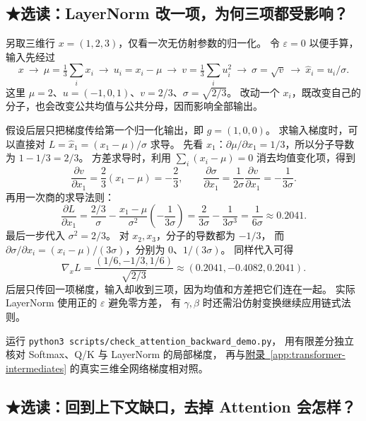 \subsection{\texorpdfstring{{\symboliconfont ★}}{★}选读：LayerNorm 改一项，为何三项都受影响？}
\label{sec:layernorm-backward-example}

另取三维行 $x=(1,2,3)$，仅看一次无仿射参数的归一化。
令 $\varepsilon=0$ 以便手算，输入先经过
\[
x\ \longrightarrow\ \mu=\tfrac13\sum_i x_i
\ \longrightarrow\ u_i=x_i-\mu
\ \longrightarrow\ v=\tfrac13\sum_i u_i^2
\ \longrightarrow\ \sigma=\sqrt{v}
\ \longrightarrow\ \widehat{x}_i=u_i/\sigma.
\]
这里 $\mu=2$、$u=(-1,0,1)$、$v=2/3$、$\sigma=\sqrt{2/3}$。
改动一个 $x_i$，既改变自己的分子，也会改变公共均值与公共分母，因而影响全部输出。

假设后层只把梯度传给第一个归一化输出，即 $g=(1,0,0)$。
求输入梯度时，可以直接对 $L=\widehat{x}_1=(x_1-\mu)/\sigma$ 求导。
先看 $x_1$：$\partial\mu/\partial x_1=1/3$，所以分子导数为 $1-1/3=2/3$。
方差求导时，利用 $\sum_i(x_i-\mu)=0$ 消去均值变化项，得到
\[
\frac{\partial v}{\partial x_1}=\frac23(x_1-\mu)=-\frac23,
\qquad
\frac{\partial\sigma}{\partial x_1}
=\frac{1}{2\sigma}\frac{\partial v}{\partial x_1}
=-\frac{1}{3\sigma}.
\]
再用一次商的求导法则：
\[
\frac{\partial L}{\partial x_1}
=\frac{2/3}{\sigma}
-\frac{x_1-\mu}{\sigma^2}\left(-\frac{1}{3\sigma}\right)
=\frac{2}{3\sigma}-\frac{1}{3\sigma^3}
=\frac{1}{6\sigma}\approx0.2041.
\]
最后一步代入 $\sigma^2=2/3$。
对 $x_2,x_3$，分子的导数都为 $-1/3$，
而 $\partial\sigma/\partial x_i=(x_i-\mu)/(3\sigma)$，分别为 $0$、$1/(3\sigma)$。
同样代入可得
\[
\nabla_x L=\frac{(1/6,-1/3,1/6)}{\sqrt{2/3}}
\approx\boxed{(0.2041,-0.4082,0.2041)}.
\]
后层只传回一项梯度，输入却收到三项，因为均值和方差把它们连在一起。
实际 LayerNorm 使用正的 $\varepsilon$ 避免零方差，
有 $\gamma,\beta$ 时还需沿仿射变换继续应用链式法则。

运行 \texttt{python3 scripts/check\_attention\_backward\_demo.py}，
用有限差分独立核对 Softmax、Q/K 与 LayerNorm 的局部梯度，
再与\hyperref[app:transformer-intermediates]{附录~\ref*{app:transformer-intermediates}} 的真实三维全网络梯度相对照。\par\medskip

\subsection{\texorpdfstring{{\symboliconfont ★}}{★}选读：回到上下文缺口，去掉 Attention 会怎样？}
\label{experiment:context-training}
